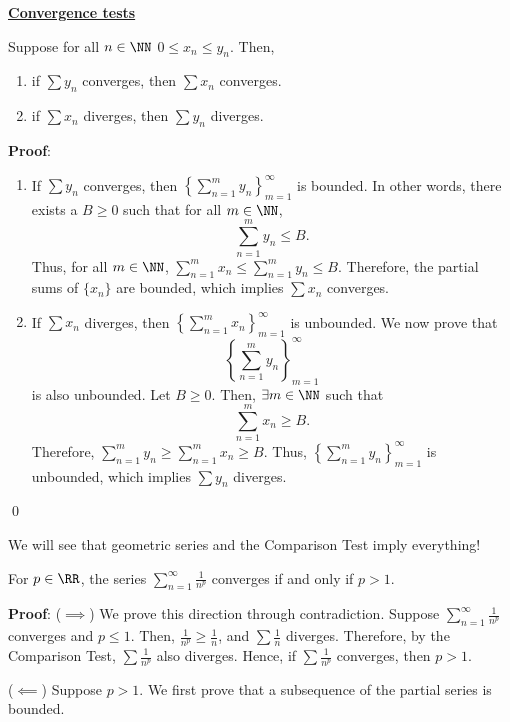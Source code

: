 \newpage\noindent\underline{\textbf{Convergence tests}}

\begin{theorem}
Suppose for all $n\in \NN$ $0\leq x_n \leq y_n$. Then,
\begin{enumerate}
\item if $\sum y_n$ converges, then $\sum x_n$ converges. 
\item if $\sum x_n$ diverges, then $\sum y_n$ diverges.
\end{enumerate}
\end{theorem}
\textbf{Proof}:
\begin{enumerate}
    \item If $\sum y_n$ converges, then $\left\{\sum_{n=1}^m y_n\right\}_{m=1}^\infty$ is bounded. In other words, there exists a $B\geq 0$ such that for all $m\in \NN$,
    \[
    \sum_{n=1}^m y_n \leq B.
    \]
    Thus, for all $m\in \NN$, $\sum_{n=1}^m x_n \leq \sum_{n=1}^m y_n \leq B$. Therefore, the partial sums of $\{x_n\}$ are bounded, which implies $\sum x_n$ converges.
    \item If $\sum x_n$ diverges, then $\left\{\sum_{n=1}^m x_n\right\}_{m=1}^\infty$ is unbounded. We now prove that \[\left\{\sum_{n=1}^m y_n\right\}_{m=1}^\infty\] is also unbounded. Let $B\geq 0$. Then, $\exists m\in \NN$ such that 
    \[
    \sum_{n=1}^m x_n \geq B.
    \]
    Therefore, $\sum_{n=1}^m y_n \geq \sum_{n=1}^m x_n \geq B$. Thus, $\left\{\sum_{n=1}^m y_n\right\}_{m=1}^\infty$ is unbounded, which implies $\sum y_n$ diverges.
\end{enumerate}
\qed 

\begin{remark}
We will see that geometric series and the Comparison Test imply everything!
\end{remark}

\begin{theorem}
For $p\in \RR$, the series $\sum_{n=1}^\infty \frac{1}{n^p}$ converges if and only if $p>1$.
\end{theorem}
\textbf{Proof}: ($\implies$) We prove this direction through contradiction. Suppose $\sum_{n=1}^\infty \frac{1}{n^p}$ converges and $p\leq 1$. Then, $\frac{1}{n^p} \geq \frac{1}{n}$, and $\sum \frac{1}{n}$ diverges. Therefore, by the Comparison Test, $\sum \frac{1}{n^p}$ also diverges. Hence, if $\sum \frac{1}{n^p}$ converges, then $p>1$.

($\impliedby$) Suppose $p>1$. We first prove that a subsequence of the partial series is bounded. 


